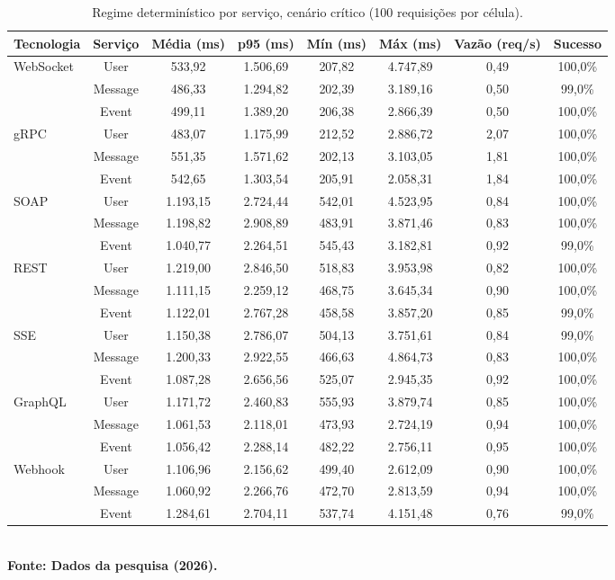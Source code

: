 \begin{table}[H]
\centering
\scriptsize
\caption{Regime determinístico por serviço, cenário crítico (100 requisições por célula).}
\label{tab:det_srv_critico}
\begin{tabular}{|l|c|c|c|c|c|c|c|}
\hline
\textbf{Tecnologia} & \textbf{Serviço} & \textbf{Média (ms)} & \textbf{p95 (ms)} & \textbf{Mín (ms)} & \textbf{Máx (ms)} & \textbf{Vazão (req/s)} & \textbf{Sucesso} \\ \hline
WebSocket & User & 533,92 & 1.506,69 & 207,82 & 4.747,89 & 0,49 & 100,0\% \\ \hline
 & Message & 486,33 & 1.294,82 & 202,39 & 3.189,16 & 0,50 & 99,0\% \\ \hline
 & Event & 499,11 & 1.389,20 & 206,38 & 2.866,39 & 0,50 & 100,0\% \\ \hline
gRPC & User & 483,07 & 1.175,99 & 212,52 & 2.886,72 & 2,07 & 100,0\% \\ \hline
 & Message & 551,35 & 1.571,62 & 202,13 & 3.103,05 & 1,81 & 100,0\% \\ \hline
 & Event & 542,65 & 1.303,54 & 205,91 & 2.058,31 & 1,84 & 100,0\% \\ \hline
SOAP & User & 1.193,15 & 2.724,44 & 542,01 & 4.523,95 & 0,84 & 100,0\% \\ \hline
 & Message & 1.198,82 & 2.908,89 & 483,91 & 3.871,46 & 0,83 & 100,0\% \\ \hline
 & Event & 1.040,77 & 2.264,51 & 545,43 & 3.182,81 & 0,92 & 99,0\% \\ \hline
REST & User & 1.219,00 & 2.846,50 & 518,83 & 3.953,98 & 0,82 & 100,0\% \\ \hline
 & Message & 1.111,15 & 2.259,12 & 468,75 & 3.645,34 & 0,90 & 100,0\% \\ \hline
 & Event & 1.122,01 & 2.767,28 & 458,58 & 3.857,20 & 0,85 & 99,0\% \\ \hline
SSE & User & 1.150,38 & 2.786,07 & 504,13 & 3.751,61 & 0,84 & 99,0\% \\ \hline
 & Message & 1.200,33 & 2.922,55 & 466,63 & 4.864,73 & 0,83 & 100,0\% \\ \hline
 & Event & 1.087,28 & 2.656,56 & 525,07 & 2.945,35 & 0,92 & 100,0\% \\ \hline
GraphQL & User & 1.171,72 & 2.460,83 & 555,93 & 3.879,74 & 0,85 & 100,0\% \\ \hline
 & Message & 1.061,53 & 2.118,01 & 473,93 & 2.724,19 & 0,94 & 100,0\% \\ \hline
 & Event & 1.056,42 & 2.288,14 & 482,22 & 2.756,11 & 0,95 & 100,0\% \\ \hline
Webhook & User & 1.106,96 & 2.156,62 & 499,40 & 2.612,09 & 0,90 & 100,0\% \\ \hline
 & Message & 1.060,92 & 2.266,76 & 472,70 & 2.813,59 & 0,94 & 100,0\% \\ \hline
 & Event & 1.284,61 & 2.704,11 & 537,74 & 4.151,48 & 0,76 & 99,0\% \\ \hline
\end{tabular}
{\footnotesize\\ \textbf{Fonte: Dados da pesquisa (2026).}}
\end{table}
